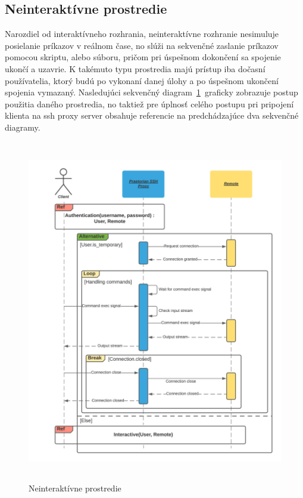\subsection{Neinteraktívne prostredie}\label{subsec:neinterkativne-prostredie}

Narozdiel od interaktívneho rozhrania, neinteraktívne rozhranie nesimuluje posielanie príkazov v reálnom čase, no slúži na
sekvenčné zaslanie príkazov pomocou skriptu, alebo súboru, pričom pri úspešnom dokončení sa spojenie ukončí a uzavrie.
K takémuto typu prostredia majú prístup iba dočasní používatelia, ktorý budú po vykonaní danej úlohy a po úspešnom ukončení spojenia
vymazaný.
Nasledujúci sekvenčný diagram~\ref{fig:obr_12}~graficky zobrazuje postup použitia daného prostredia, no taktiež pre úplnosť
celého postupu pri pripojení klienta na ssh proxy server obsahuje referencie na predchádzajúce dva sekvenčné diagramy.

\begin{figure}[H]
\begin{center}\includegraphics[width=\textwidth,height=15cm,keepaspectratio=true]{assets/sequence_diagram_non_interactive.png}\end{center}
\caption[Neinteraktívne prostredie]{Neinteraktívne prostredie}\label{fig:obr_12}
\end{figure}

